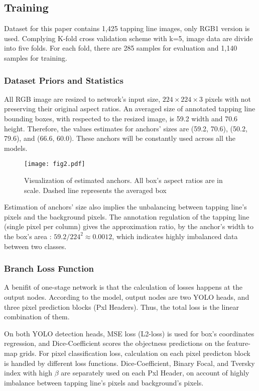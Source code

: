 \documentclass[default,pdflatex,iicol]{sn-jnl}%
\begin{document}
\subsection{Training}
Dataset for this paper contains 1,425 tapping line images, only RGB1 version \cite{Wongtanawijit_2021} is used. Complying K-fold cross validation scheme with k=5, image data are divide into five folds. For each fold, there are 285 samples for evaluation and 1,140 samples for training.

\subsubsection{Dataset Priors and Statistics}
All RGB image are resized to network's input size, $224\times224\times3$ pixels with not preserving their original aspect ratios. An averaged size of annotated tapping line bounding boxes, with respected to the resized image, is 59.2 width and 70.6 height. Therefore, the values estimates for anchors' sizes are (59.2, 70.6), (50.2, 79.6), and (66.6, 60.0). These anchors will be constantly used across all the models.

\begin{figure}[h]%
\centering
\texttt{[image: fig2.pdf]}
\caption{Visualization of estimated anchors. All box's aspect ratios are in scale. Dashed line represents the averaged box}\label{fig2-anchors}
\end{figure}

Estimation of anchors' size also implies the unbalancing between tapping line's pixels and the background pixels. The annotation regulation of the tapping line (single pixel per column) gives the approximation ratio, by the anchor's width to the box's area : $59.2 / 224^2 \approx 0.0012$, which indicates highly imbalanced data between two classes.

\subsubsection{Branch Loss Function}
A benifit of one-stage network is that the calculation of losses happens at the output nodes. According to the model, output nodes are two YOLO heads, and three pixel prediction blocks (Pxl Headers). Thus, the total loss is the linear combination of them.

On both YOLO detection heads, MSE loss (L2-loss) is used for box's coordinates regression, and Dice-Coefficient scores the objectness predictions on the feature-map grids. For pixel classification loss, calculation on each pixel predicton block is handled by different loss functions. Dice-Coefficient, Binary Focal, and Tversky index with high $\beta$ are separately used on each Pxl Header, on account of highly imbalance between tapping line's pixels and background's pixels.
\end{document}
